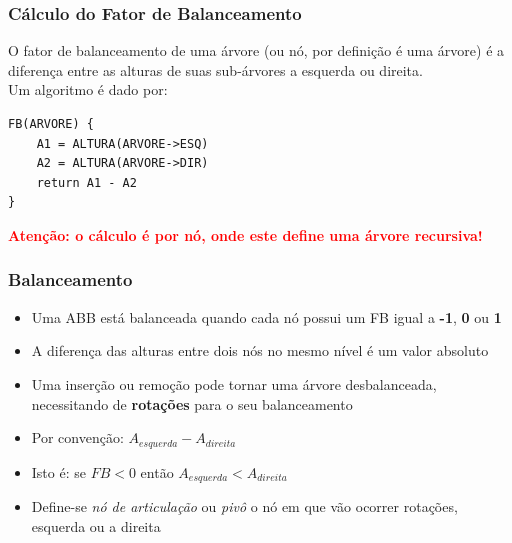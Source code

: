 \begin{frame}[fragile]
\frametitle{Cálculo do Fator de Balanceamento}


\begin{block}{}
O fator de balanceamento de uma árvore (ou nó, por definição é uma árvore) 
é a diferença entre as alturas de suas sub-árvores a esquerda ou direita.\\ 
Um algoritmo é  dado por:
\end{block}

\begin{verbatim}
FB(ARVORE) {
    A1 = ALTURA(ARVORE->ESQ)
    A2 = ALTURA(ARVORE->DIR)
    return A1 - A2 
}
\end{verbatim}

\begin{center}
\textbf{
\textcolor{red}{Atenção: o cálculo é por nó, onde este define uma árvore recursiva!}
}
\end{center}

\end{frame}

\begin{frame}
    \frametitle{Balanceamento}
    
    \begin{block}{}
    
    \begin{itemize}
    \item Uma ABB está balanceada quando cada nó possui um FB igual a \textbf{-1}, \textbf{0} ou \textbf{1}
    \item A diferença das alturas entre dois nós no mesmo nível é um valor absoluto
    \item Uma inserção ou remoção pode tornar uma árvore desbalanceada, necessitando de \textbf{rotações}  para o seu balanceamento
    
    \pause
    \item Por convenção: $A_{esquerda} - A_{direita}$ 
    \item Isto é: se $FB < 0$ então $A_{esquerda} < A_{direita}$
    
    \pause
    \item Define-se \textit{nó de articulação} ou \textit{pivô} o nó
    em que vão ocorrer rotações, esquerda ou a direita
    \end{itemize}
    
    \end{block}
    
    
\end{frame}

